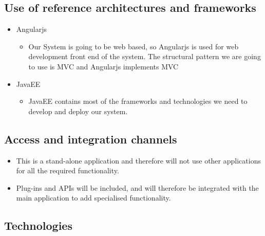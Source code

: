 \documentclass[a4paper,12pt]{article}
\begin{document}

\subsection{Use of reference architectures and frameworks}
\begin{itemize}
\item Angularjs
	\begin{itemize}
		\item Our System is going to be web based, so Angularjs is used for web development front end of the system. The structural pattern we are going to use is MVC and Angularjs implements MVC
	\end{itemize}
\item JavaEE
	\begin{itemize}
		\item JavaEE contains most of the frameworks and technologies we need to develop  and deploy our system.
	\end{itemize}
\end{itemize}

\subsection{Access and integration channels}
	\begin{itemize}
		\item This is a stand-alone application and therefore will not use other applications for all the required functionality.
		\item Plug-ins and APIs will be included, and will therefore be integrated with the main application to add specialised 				functionality. 
	\end{itemize}

\subsection{Technologies}
\end{document}
